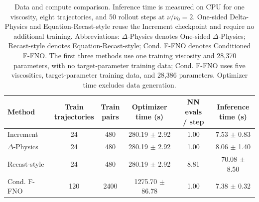\begin{table}[!t]
\centering
\normalsize
\setlength{\tabcolsep}{3pt}
\renewcommand{\arraystretch}{1.17}
\begin{tabular}{@{}lccccc@{}}
\toprule
Method & \shortstack{Train\\trajectories} & \shortstack{Train\\pairs} & \shortstack{Optimizer\\time (s)} & \shortstack{NN evals\\/ step} & \shortstack{Inference\\time (s)} \\
\midrule
Increment & 24 & 480 & 280.19 $\pm$ 2.92 & 1.00 & 7.53 $\pm$ 0.83 \\
$\Delta$-Physics & 24 & 480 & 280.19 $\pm$ 2.92 & 1.00 & 8.06 $\pm$ 1.40 \\
Recast-style & 24 & 480 & 280.19 $\pm$ 2.92 & 8.81 & 70.08 $\pm$ 8.50 \\
Cond. F-FNO & 120 & 2400 & 1275.70 $\pm$ 86.78 & 1.00 & 7.38 $\pm$ 0.32 \\
\bottomrule
\end{tabular}
\caption{Data and compute comparison. Inference time is measured on CPU for one viscosity, eight trajectories, and 50 rollout steps at $\nu/\nu_0=2$. One-sided Delta-Physics and Equation-Recast-style reuse the Increment checkpoint and require no additional training. Abbreviations: $\Delta$-Physics denotes One-sided $\Delta$-Physics; Recast-style denotes Equation-Recast-style; Cond. F-FNO denotes Conditioned F-FNO. The first three methods use one training viscosity and 28,370 parameters, with no target-parameter training data; Cond. F-FNO uses five viscosities, target-parameter training data, and 28,386 parameters. Optimizer time excludes data generation.}
\label{tab:data_compute}
\end{table}
